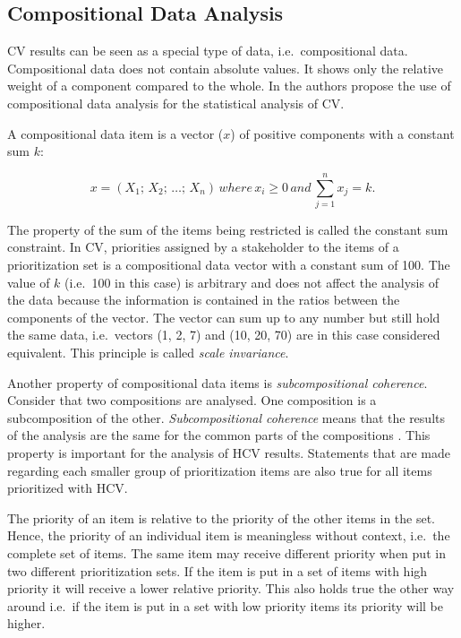 
\subsection{\label{coda}Compositional Data Analysis}
CV results can be seen as a special type of data, i.e.\ compositional data.
Compositional data does not contain absolute values. It shows only
the relative weight of a component compared to the whole. In \cite{Chatzipetrou2010} the authors
propose the use of compositional data analysis for the statistical analysis of CV. 

A compositional data item is a vector ($x$) of positive components with a constant sum $k$:

\begin{equation}
x=(X_{1};\, X_{2};\,\ldots;\, X_{n})\, where\, x_{i}\geq0\, and\,\sum_{j=1}^{n}x_{j}=k.
\label{eq:compositional-data}
\end{equation}

The property of the sum of the items being restricted is called the constant
sum constraint. In CV, priorities assigned by a stakeholder to the items of a prioritization
set is a compositional data vector with a constant sum of 100.
The value of $k$ (i.e.\ 100 in this case) is arbitrary and does not affect the analysis 
of the data because the information is contained in the ratios between the components of 
the vector. The vector can sum up to any number but still hold the same data, i.e.\ vectors 
(1, 2, 7) and (10, 20, 70) are in this case considered equivalent.
This principle is called \emph{scale invariance}.

Another property of compositional data items is \emph{subcompositional coherence}.
Consider that two compositions are analysed. One composition is a subcomposition of the other.
\emph{Subcompositional coherence} means that the results of the analysis are the same for the common parts of the compositions \cite{Aitchison2005}.
This property is important for the analysis of HCV results.
Statements that are made regarding each smaller group of prioritization items are also true for all items prioritized with HCV.

The priority of an item is relative to the priority of the other items
in the set. Hence, the priority of an individual item is meaningless without
context, i.e.\ the complete set of items. The same item may receive different priority
when put in two different prioritization sets. If the item is put
in a set of items with high priority it will receive a lower relative
priority. This also holds true the other way around i.e.\ if the item is put in a set
with low priority items its priority will be higher.

